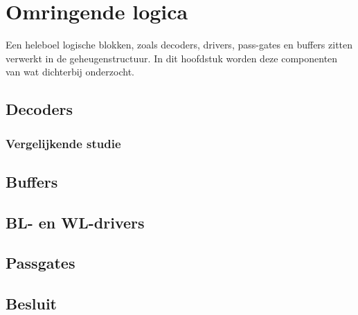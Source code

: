 \chapter{Omringende logica}
\label{periphery}

Een heleboel logische blokken, zoals decoders, drivers, pass-gates en buffers zitten verwerkt in de geheugenstructuur.
In dit hoofdstuk worden deze componenten van wat dichterbij onderzocht.

\section{Decoders}

\subsection{Vergelijkende studie}

\section{Buffers}

\section{BL- en WL-drivers}

\section{Passgates}


\section{Besluit}

